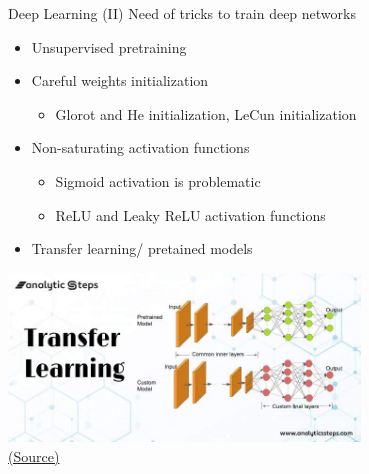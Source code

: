 \documentclass[10pt,compress]{beamer} %
\begin{document}
\begin{frame}{Deep Learning (II)}
	Need of tricks to train deep networks
	\begin{itemize}
		\item Unsupervised pretraining
		\item Careful weights initialization
			\begin{itemize}
			\item Glorot and He initialization, LeCun initialization
			\end{itemize}
		\item Non-saturating activation functions
			\begin{itemize}
			\item Sigmoid activation is problematic
			\item ReLU and Leaky ReLU activation functions
			\end{itemize}
		\item Transfer learning/ pretained models
	\end{itemize}
		\centering \includegraphics[width=0.7\textwidth]{figs/transfer.jpg}\\
	\scriptsize\href{https://www.analyticssteps.com/blogs/how-transfer-learning-done-neural-networks-and-convolutional-neural-networks}{(Source)}\\
\end{frame}
\end{document}
